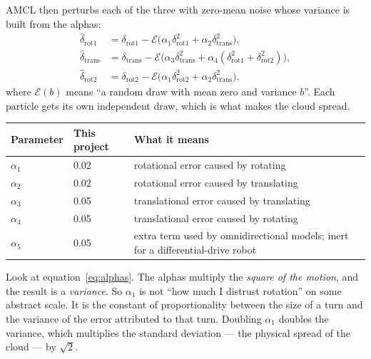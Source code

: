 \documentclass[11pt,a4paper]{report}
\begin{document}
AMCL then perturbs each of the three with zero-mean noise whose variance is
built from the alphas:
\begin{equation}
\begin{aligned}
\hat\delta_{\text{rot}1} &= \delta_{\text{rot}1}
   - \mathcal{E}\bigl(\alpha_1 \delta_{\text{rot}1}^2 + \alpha_2 \delta_{\text{trans}}^2\bigr), \\
\hat\delta_{\text{trans}} &= \delta_{\text{trans}}
   - \mathcal{E}\bigl(\alpha_3 \delta_{\text{trans}}^2 + \alpha_4 (\delta_{\text{rot}1}^2 + \delta_{\text{rot}2}^2)\bigr), \\
\hat\delta_{\text{rot}2} &= \delta_{\text{rot}2}
   - \mathcal{E}\bigl(\alpha_1 \delta_{\text{rot}2}^2 + \alpha_2 \delta_{\text{trans}}^2\bigr),
\end{aligned}
\label{eq:alphas}
\end{equation}
where $\mathcal{E}(b)$ means ``a random draw with mean zero and variance $b$''.
Each particle gets its own independent draw, which is what makes the cloud
spread.

\begin{center}
\begin{tabular}{@{}llp{7.6cm}@{}}
\toprule
\textbf{Parameter} & \textbf{This project} & \textbf{What it means} \\
\midrule
$\alpha_1$ & 0.02 & rotational error caused by rotating \\
$\alpha_2$ & 0.02 & rotational error caused by translating \\
$\alpha_3$ & 0.05 & translational error caused by translating \\
$\alpha_4$ & 0.05 & translational error caused by rotating \\
$\alpha_5$ & 0.05 & extra term used by omnidirectional models; inert for a
                    differential-drive robot \\
\bottomrule
\end{tabular}
\end{center}

\begin{keyidea}
Look at equation~\eqref{eq:alphas}. The alphas multiply the \emph{square of the
motion}, and the result is a \emph{variance}. So $\alpha_1$ is not ``how much I
distrust rotation'' on some abstract scale. It is the constant of
proportionality between the size of a turn and the variance of the error
attributed to that turn. Doubling $\alpha_1$ doubles the variance, which
multiplies the standard deviation --- the physical spread of the cloud --- by
$\sqrt{2}$.
\end{keyidea}
\end{document}
